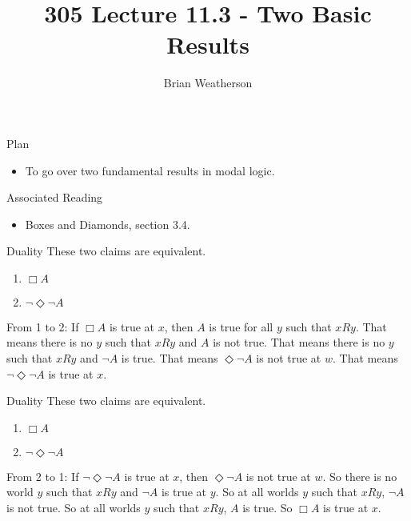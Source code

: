 \documentclass[
  ignorenonframetext,
]{beamer}
\title{305 Lecture 11.3 - Two Basic Results}
\author{Brian Weatherson}
\date{}
\providecommand{\tightlist}{%
  \setlength{\itemsep}{0pt}\setlength{\parskip}{0pt}}
\renewcommand{\,}{\text{, }}
\begin{document}
\frame{\titlepage}

\begin{frame}{Plan}
\protect\hypertarget{plan}{}
\begin{itemize}
\tightlist
\item
  To go over two fundamental results in modal logic.
\end{itemize}
\end{frame}

\begin{frame}{Associated Reading}
\protect\hypertarget{associated-reading}{}
\begin{itemize}
\tightlist
\item
  Boxes and Diamonds, section 3.4.
\end{itemize}
\end{frame}

\begin{frame}{Duality}
\protect\hypertarget{duality}{}
These two claims are equivalent.

\begin{enumerate}
\tightlist
\item
  \(\Box A\)
\item
  \(\neg \Diamond \neg A\)\pause
\end{enumerate}

From 1 to 2: If \(\Box A\) is true at \(x\), then \(A\) is true for all
\(y\) such that \(xRy\). That means there is no \(y\) such that \(xRy\)
and \(A\) is not true. That means there is no \(y\) such that \(xRy\)
and \(\neg A\) is true. That means \(\Diamond \neg A\) is not true at
\(w\). That means \(\neg \Diamond \neg A\) is true at \(x\).
\end{frame}

\begin{frame}{Duality}
\protect\hypertarget{duality-1}{}
These two claims are equivalent.

\begin{enumerate}
\tightlist
\item
  \(\Box A\)
\item
  \(\neg \Diamond \neg A\)\pause
\end{enumerate}

From 2 to 1: If \(\neg \Diamond \neg A\) is true at \(x\), then
\(\Diamond \neg A\) is not true at \(w\). So there is no world \(y\)
such that \(xRy\) and \(\neg A\) is true at \(y\). So at all worlds
\(y\) such that \(xRy\), \(\neg A\) is not true. So at all worlds \(y\)
such that \(xRy\), \(A\) is true. So \(\Box A\) is true at \(x\).
\end{frame}
\end{document}
